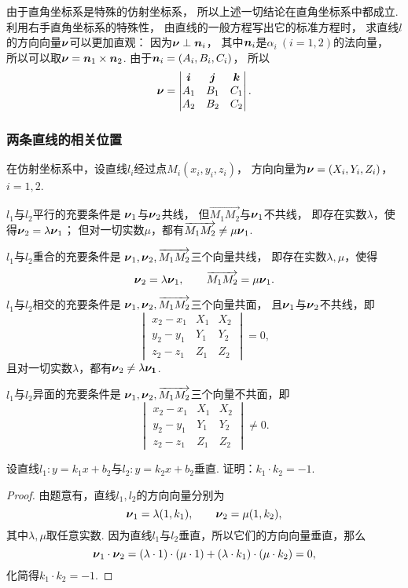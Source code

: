 由于直角坐标系是特殊的仿射坐标系，
所以上述一切结论在直角坐标系中都成立.
利用右手直角坐标系的特殊性，
由直线的一般方程写出它的标准方程时，
求直线\(l\)的方向向量\(\boldsymbol{\nu}\)可以更加直观：
因为\(\boldsymbol{\nu}\perp\boldsymbol{n}_i\)，
其中\(\boldsymbol{n}_i\)是\(\alpha_i\ (i=1,2)\)的法向量，
所以可以取\(\boldsymbol{\nu}=\boldsymbol{n}_1\times\boldsymbol{n}_2\).
由于\(\boldsymbol{n}_i = (A_i,B_i,C_i)\)，
所以\[
	\boldsymbol{\nu}
	= \begin{vmatrix}
		\boldsymbol{i} & \boldsymbol{j} & \boldsymbol{k} \\
		A_1 & B_1 & C_1 \\
		A_2 & B_2 & C_2
	\end{vmatrix}.
\]

\subsubsection{两条直线的相关位置}
在仿射坐标系中，设直线\(l_i\)经过点\(M_i(x_i,y_i,z_i)\)，
方向向量为\(\boldsymbol{\nu}=(X_i,Y_i,Z_i)\)，\(i=1,2\).

\(l_1\)与\(l_2\)平行的充要条件是
\(\boldsymbol{\nu}_1\)与\(\boldsymbol{\nu}_2\)共线，
但\(\vec{M_1 M_2}\)与\(\boldsymbol{\nu}_1\)不共线，
即存在实数\(\lambda\)，使得\(\boldsymbol{\nu}_2 = \lambda \boldsymbol{\nu}_1\)；
但对一切实数\(\mu\)，都有\(\overrightarrow{M_1 M_2} \neq \mu \boldsymbol{\nu}_1\).

\(l_1\)与\(l_2\)重合的充要条件是
\(\boldsymbol{\nu}_1,\boldsymbol{\nu}_2,\overrightarrow{M_1 M_2}\)三个向量共线，
即存在实数\(\lambda,\mu\)，使得\[
	\boldsymbol{\nu}_2 = \lambda \boldsymbol{\nu}_1,
	\qquad
	\overrightarrow{M_1 M_2} = \mu \boldsymbol{\nu}_1.
\]

\(l_1\)与\(l_2\)相交的充要条件是
\(\boldsymbol{\nu}_1,\boldsymbol{\nu}_2,\overrightarrow{M_1 M_2}\)三个向量共面，
且\(\boldsymbol{\nu}_1\)与\(\boldsymbol{\nu}_2\)不共线，即\[
	\begin{vmatrix}
		x_2 - x_1 & X_1 & X_2 \\
		y_2 - y_1 & Y_1 & Y_2 \\
		z_2 - z_1 & Z_1 & Z_2
	\end{vmatrix} = 0,
\]
且对一切实数\(\lambda\)，都有\(\boldsymbol{\nu}_2 \neq \lambda \boldsymbol{\nu_1}\).

\(l_1\)与\(l_2\)异面的充要条件是
\(\boldsymbol{\nu}_1,\boldsymbol{\nu}_2,\overrightarrow{M_1 M_2}\)三个向量不共面，即\[
	\begin{vmatrix}
		x_2 - x_1 & X_1 & X_2 \\
		y_2 - y_1 & Y_1 & Y_2 \\
		z_2 - z_1 & Z_1 & Z_2
	\end{vmatrix} \neq 0.
\]

\begin{example}
设直线\(l_1: y=k_1 x+b_2\)与\(l_2: y=k_2 x+b_2\)垂直.
证明：\(k_1 \cdot k_2 = -1\).
\begin{proof}
由题意有，直线\(l_1,l_2\)的方向向量分别为\[
	\boldsymbol{\nu}_1 = \lambda (1,k_1), \qquad
	\boldsymbol{\nu}_2 = \mu (1,k_2),
\]
其中\(\lambda,\mu\)取任意实数.
因为直线\(l_1\)与\(l_2\)垂直，所以它们的方向向量垂直，那么\[
	\boldsymbol{\nu}_1\cdot\boldsymbol{\nu}_2
	= (\lambda \cdot 1) \cdot (\mu \cdot 1)
	+ (\lambda \cdot k_1) \cdot (\mu \cdot k_2) = 0,
\]
化简得\(k_1 \cdot k_2 = -1\).
\end{proof}
\end{example}

